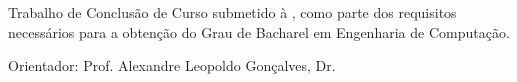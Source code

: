 \begin{titlepage}
	\vfill
	\begin{center}
		\ABNTautordata \\[5cm]
		
		\tituloformat{\ABNTtitulodata} 
		\tituloformat{\subtitulodata} \\[1cm]
		
		
		\hspace{.45\textwidth} %
		\begin{minipage}{.5\textwidth}
			\begin{espacosimples}
				
				\textnormal{Trabalho de Conclusão de Curso submetido à \ABNTinstituicaodata,
				como parte dos requisitos necessários para a obtenção do Grau de
				Bacharel em Engenharia de Computação.}
				
				\textnormal{Orientador: Prof. Alexandre Leopoldo Gonçalves, Dr.}
			\end{espacosimples}
		\end{minipage}
		
		\vfill 
		\localformat \ABNTlocaldata\\
		\anodata
	
	\end{center}
	\vspace{1cm}
\end{titlepage}



